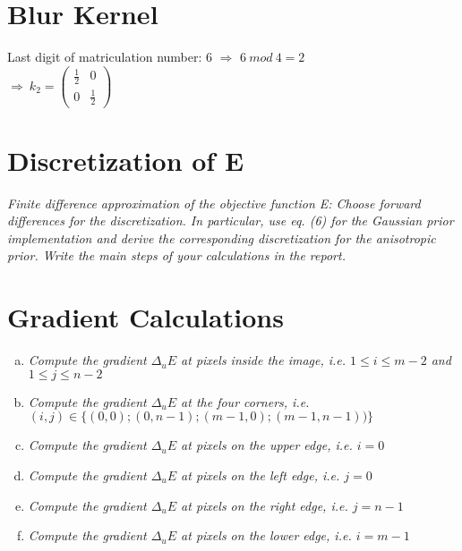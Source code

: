 \documentclass{report}
\begin{document}
	\section{Blur Kernel}
	\startsection
		Last digit of matriculation number: 6 $\Rightarrow$ $6 \ mod \ 4 = 2$ \\
		$\Rightarrow \ k_2 = \begin{pmatrix} \frac{1}{2} & 0 \\ 0 & \frac{1}{2} \end{pmatrix}$
	\closesection

	\section{Discretization of E}
	\startsection
		\textit{Finite difference approximation of the objective function E: Choose forward differences for the discretization.
In particular, use eq. (6) for the Gaussian prior implementation and derive the corresponding discretization
for the anisotropic prior. Write the main steps of your calculations in the report.} \\
	\closesection
	
	\section{Gradient Calculations}
	\startsection
		\begin{enumerate}[(a)]
			\item \textit{Compute the gradient $\Delta_u E$ at pixels inside the image, i.e. $1 \leq i \leq m-2$ and $1 \leq j \leq n-2$} \\
			\item \textit{Compute the gradient $\Delta_u E$ at the four corners, i.e. $(i,j) \in \{ (0,0); (0,n-1);(m-1,0);(m-1,n-1)) \}$} \\
			\item \textit{Compute the gradient $\Delta_u E$ at pixels on the upper edge, i.e. $i = 0$} \\
			\item \textit{Compute the gradient $\Delta_u E$ at pixels on the left edge, i.e. $j = 0$} \\
			\item \textit{Compute the gradient $\Delta_u E$ at pixels on the right edge, i.e. $j = n - 1$} \\
			\item \textit{Compute the gradient $\Delta_u E$ at pixels on the lower edge, i.e. $i = m-1$}
		\end{enumerate}
	\closesection
\end{document}
